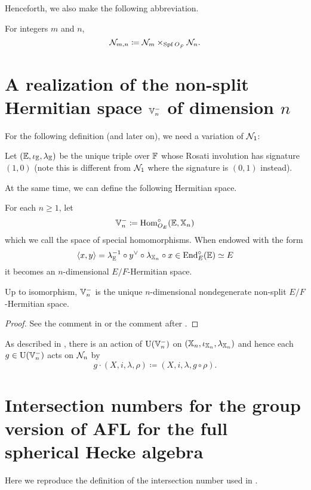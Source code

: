 Henceforth, we also make the following abbreviation.
\begin{definition}
  [$\RZ_{m,n}$]
  For integers $m$ and $n$,
  \[ \mathcal N_{m,n} \coloneq \mathcal N_{m} \times_{\operatorname{Spf} O_{\breve F}} \mathcal N_n. \]
\end{definition}

\section{A realization of the non-split Hermitian space $\VV_n^-$ of dimension $n$}
For the following definition (and later on), we need a variation of $\mathcal N_1$:
\begin{definition}
  [$\EE$]
  Let $(\mathbb E, \iota_\mathbb E, \lambda_\mathbb E)$ be the unique triple over $\mathbb F$
  whose Rosati involution has signature $(1,0)$
  (note this is different from $\mathcal N_1$ where the signature is $(0,1)$ instead).
\end{definition}

At the same time, we can define the following Hermitian space.
\begin{definition}
  For each $n \ge 1$, let
  \[ \mathbb V_n^- \coloneqq \operatorname{Hom}_{O_E}^\circ (\mathbb E, \mathbb X_n) \]
  which we call the space of special homomorphisms.
  When endowed with the form
  \[ \left< x,y \right> = \lambda_{\mathbb E}^{-1} \circ y^\vee \circ \lambda_{\mathbb X_n} \circ x
    \in \operatorname{End}_{E}^\circ(\mathbb E) \simeq E \]
  it becomes an $n$-dimensional $E/F$-Hermitian space.
  \label{def:VV_n_nonsplit}
\end{definition}
\begin{proposition}
  [Realization of $\VV_n^-$]
  Up to isomorphism, $\VV_n^-$ is the unique $n$-dimensional
  nondegenerate non-split $E/F$-Hermitian space.
\end{proposition}
\begin{proof}
  See the comment in \cite[\S5.2]{ref:AFLspherical}
  or the comment after \cite[Equation (4.2)]{ref:survey}.
\end{proof}

As described in \cite[Equation (4.3)]{ref:survey}, there is an action of
$\operatorname{U}(\mathbb V_n^-)$ on $(\mathbb X_n, \iota_{\mathbb X_n}, \lambda_{\mathbb X_n})$
and hence each $g \in \operatorname{U}(\mathbb V_n^-)$ acts on $\mathcal N_n$ by
\[ g \cdot (X, i, \lambda, \rho) \coloneqq (X, i, \lambda, g \circ \rho). \]

\section{Intersection numbers for the group version of AFL for the full spherical Hecke algebra}
Here we reproduce the definition of the intersection number used in .

